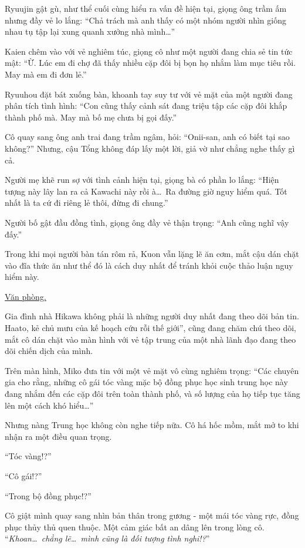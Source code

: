 \documentclass[../main.tex]{subfiles}
\begin{document}
Ryuujin gật gù, như thể cuối cùng hiểu ra vấn đề hiện tại, giọng ông trầm ấm nhưng đầy vẻ lo lắng: ``Chả trách mà anh thấy có một nhóm người nhìn giống nhau tụ tập lại xung quanh xưởng nhà mình\dots''

Kaien chêm vào với vẻ nghiêm túc, giọng cô như một người đang chia sẻ tin tức mật: ``Ừ. Lúc em đi chợ đã thấy nhiều cặp đôi bị bọn họ nhắm làm mục tiêu rồi. May mà em đi đơn lẻ.''

Ryuuhou đặt bát xuống bàn, khoanh tay suy tư với vẻ mặt của một người đang phân tích tình hình: ``Con cũng thấy cảnh sát đang triệu tập các cặp đôi khắp thành phố mà. May mà bố mẹ chưa bị gọi đấy.''

Cô quay sang ông anh trai đang trầm ngâm, hỏi: ``Onii-san, anh có biết tại sao không?'' Nhưng, cậu Tổng không đáp lấy một lời, giả vờ như chẳng nghe thấy gì cả.

Người mẹ khẽ run sợ với tình cảnh hiện tại, giọng bà có phần lo lắng: ``Hiện tượng này lây lan ra cả Kawachi này rồi à\dots\ Ra đường giờ nguy hiểm quá. Tốt nhất là ta cứ đi riêng lẻ thôi, đừng đi chung.''

Người bố gật đầu đồng tình, giọng ông đầy vẻ thận trọng: ``Anh cũng nghĩ vậy đấy.''

Trong khi mọi người bàn tán rôm rả, Kuon vẫn lặng lẽ ăn cơm, mắt cậu dán chặt vào đĩa thức ăn như thể đó là cách duy nhất để tránh khỏi cuộc thảo luận nguy hiểm này.

\begin{center}
  \uline{Văn phòng.}
\end{center}

Gia đình nhà Hikawa không phải là những người duy nhất đang theo dõi bản tin. Haato, kẻ chủ mưu của kế hoạch cứu rỗi thế giới'', cũng đang chăm chú theo dõi, mắt cô dán chặt vào màn hình với vẻ tập trung của một nhà lãnh đạo đang theo dõi chiến dịch của mình.

Trên màn hình, Miko đưa tin với một vẻ mặt vô cùng nghiêm trọng: ``Các chuyên gia cho rằng, những cô gái tóc vàng mặc bộ đồng phục học sinh trung học này đang nhắm đến các cặp đôi trên toàn thành phố, và số lượng của họ tiếp tục tăng lên một cách khó hiểu\dots''

Nhưng nàng Trung học không còn nghe tiếp nữa. Cô há hốc mồm, mắt mở to khi nhận ra một điều quan trọng.

``Tóc vàng!?''

``Cô gái!?''

``Trong bộ đồng phục!?''

Cô giật mình quay sang nhìn bản thân trong gương - một mái tóc vàng rực, đồng phục thủy thủ quen thuộc. Một cảm giác bất an dâng lên trong lòng cô. ``\textit{Khoan\dots\ chẳng lẽ\dots\ mình cũng là đối tượng tình nghi!?}''
\end{document}
